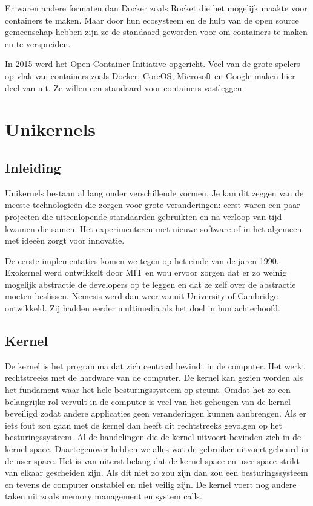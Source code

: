 \documentclass[pdftex,a4paper,12pt,twoside]{report}
\begin{document}
Er waren andere formaten dan Docker zoals Rocket die het mogelijk maakte voor containers te maken. Maar door hun ecosysteem en de hulp van de open source gemeenschap hebben zijn ze de standaard geworden voor om containers te maken en te verspreiden.

In 2015 werd het Open Container Initiative opgericht. Veel van de grote spelers op vlak van containers zoals Docker, CoreOS, Microsoft en Google maken hier deel van uit. Ze willen een standaard voor containers vastleggen.

\chapter{Unikernels}
\label{ch:unikernels}

\section{Inleiding}

Unikernels bestaan al lang onder verschillende vormen. Je kan dit zeggen van de meeste technologieën die zorgen voor grote veranderingen: eerst waren een paar projecten die uiteenlopende standaarden gebruikten en na verloop van tijd kwamen die samen. Het experimenteren met nieuwe software of in het algemeen met ideeën zorgt voor innovatie. 

De eerste implementaties komen we tegen op het einde van de jaren 1990. Exokernel werd ontwikkelt door MIT en wou ervoor zorgen dat er zo weinig mogelijk abstractie de developers op te leggen en dat ze zelf over de abstractie moeten beslissen. Nemesis werd dan weer vanuit University of Cambridge ontwikkeld. Zij hadden eerder multimedia als het doel in hun achterhoofd. 

\section{Kernel}

De kernel is het programma dat zich centraal bevindt in de computer. Het werkt rechtstreeks met de hardware van de computer.  De kernel kan gezien worden als het fundament waar het hele besturingssysteem op steunt. Omdat het zo een belangrijke rol vervult in de computer is veel van het geheugen van de kernel beveiligd zodat andere applicaties geen veranderingen kunnen aanbrengen. Als er iets fout zou gaan met de kernel dan heeft dit rechtstreeks gevolgen op het besturingssysteem. Al de handelingen die de kernel uitvoert bevinden zich in de kernel space. Daartegenover hebben we alles wat de gebruiker uitvoert gebeurd in de user space. Het is van uiterst belang dat de kernel space en user space strikt van elkaar gescheiden zijn. Als dit niet zo zou zijn dan zou een besturingssysteem en tevens de computer onstabiel en niet veilig zijn. De kernel voert nog andere taken uit zoals memory management en system calls.
\end{document}

